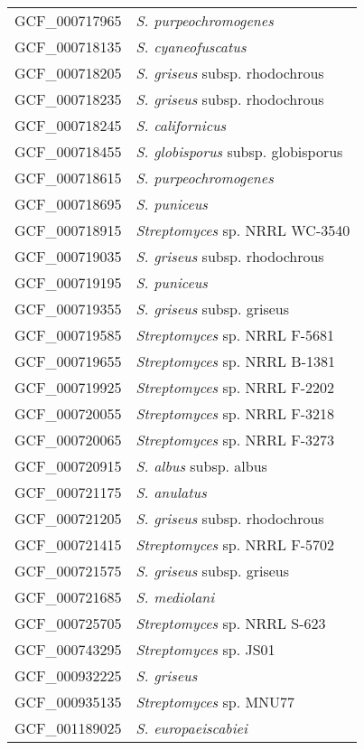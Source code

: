 \begin{longtable}{p{0.5\asdf}p{0.5\asdf}}
	GCF\_000717965 	&	\emph{S. purpeochromogenes}	\\
	GCF\_000718135 	&	\emph{S. cyaneofuscatus}	\\
	GCF\_000718205 	&	\emph{S. griseus} subsp. rhodochrous	\\
	GCF\_000718235 	&	\emph{S. griseus }subsp. rhodochrous	\\
	GCF\_000718245 	&	\emph{S. californicus}	\\
	GCF\_000718455 	&	\emph{S}\emph{. globisporus} subsp. globisporus	\\
	GCF\_000718615 	&	\emph{S. purpeochromogenes}	\\
	GCF\_000718695 	&	\emph{S. puniceus}	\\
	GCF\_000718915 	&	\emph{Streptomyces} sp. NRRL WC-3540	\\
	GCF\_000719035 	&	\emph{S. griseus} subsp. rhodochrous	\\
	GCF\_000719195 	&	\emph{S. puniceus}	\\
	GCF\_000719355 	&	\emph{S. griseus} subsp. griseus	\\
	GCF\_000719585 	&	\emph{Streptomyces} sp. NRRL F-5681	\\
	GCF\_000719655 	&	\emph{Streptomyces} sp. NRRL B-1381	\\
	GCF\_000719925 	&	\emph{Streptomyces} sp. NRRL F-2202	\\
	GCF\_000720055 	&	\emph{Streptomyces} sp. NRRL F-3218	\\
	GCF\_000720065 	&	\emph{Streptomyces} sp. NRRL F-3273	\\
	GCF\_000720915 	&	\emph{S. albus} subsp. albus	\\
	GCF\_000721175 	&	\emph{S. anulatus}	\\
	GCF\_000721205 	&	\emph{S. griseus} subsp. rhodochrous	\\\emph{}
	GCF\_000721415 	&	\emph{Streptomyces} sp. NRRL F-5702	\\
	GCF\_000721575 	&	\emph{S. griseus} subsp. griseus	\\
	GCF\_000721685 	&	\emph{S. mediolani}	\\
	GCF\_000725705 	&	\emph{Streptomyces} sp. NRRL S-623	\\
	GCF\_000743295 	&	\emph{Streptomyces} sp. JS01	\\
	GCF\_000932225 	&	\emph{S. griseus}	\\
	GCF\_000935135 	&	\emph{Streptomyces} sp. MNU77	\\
	GCF\_001189025 	&	\emph{S. europaeiscabiei}	\\

\end{longtable}
